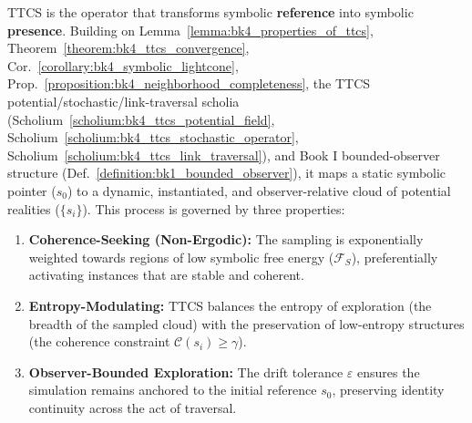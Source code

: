 \begin{theorem}
\label{theorem:bk4_symbolic_link_activation}
TTCS is the operator that transforms symbolic \textbf{reference} into symbolic \textbf{presence}. Building on Lemma~\ref{lemma:bk4_properties_of_ttcs}, Theorem~\ref{theorem:bk4_ttcs_convergence}, Cor.~\ref{corollary:bk4_symbolic_lightcone}, Prop.~\ref{proposition:bk4_neighborhood_completeness}, the TTCS potential/stochastic/link-traversal scholia (Scholium~\ref{scholium:bk4_ttcs_potential_field}, Scholium~\ref{scholium:bk4_ttcs_stochastic_operator}, Scholium~\ref{scholium:bk4_ttcs_link_traversal}), and Book I bounded-observer structure (Def.~\ref{definition:bk1_bounded_observer}), it maps a static symbolic pointer ($s_0$) to a dynamic, instantiated, and observer-relative cloud of potential realities ($\{s_i\}$). This process is governed by three properties:
\begin{enumerate}
    \item \textbf{Coherence-Seeking (Non-Ergodic):} The sampling is exponentially weighted towards regions of low symbolic free energy ($\mathcal{F}_S$), preferentially activating instances that are stable and coherent.
    \item \textbf{Entropy-Modulating:} TTCS balances the entropy of exploration (the breadth of the sampled cloud) with the preservation of low-entropy structures (the coherence constraint $\mathcal{C}(s_i) \geq \gamma$).
    \item \textbf{Observer-Bounded Exploration:} The drift tolerance $\varepsilon$ ensures the simulation remains anchored to the initial reference $s_0$, preserving identity continuity across the act of traversal.
\end{enumerate}
\end{theorem}


